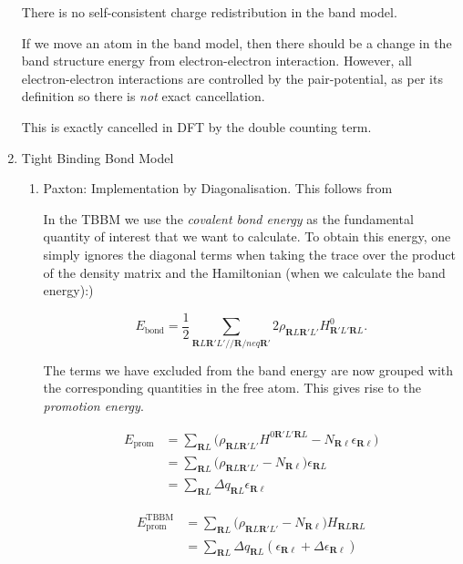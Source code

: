 \documentclass[11pt]{article}
\begin{document}
\begin{enumerate}
There is no self-consistent charge redistribution in the band model.

If we move an atom in the band model, then there should be a change in the band structure energy from electron-electron interaction. 
However, all electron-electron interactions are controlled by the pair-potential, as per its definition so there is \emph{not} exact 
cancellation. 

This is exactly cancelled in DFT by the double counting term. 


\item Tight Binding Bond Model
\label{sec:org6c91632}

\begin{enumerate}
\item Paxton: Implementation by Diagonalisation.
\label{sec:orga9fcfa0}
This follows from \cite{Paxton:153084}

In the TBBM we use the \emph{covalent bond energy} as the fundamental quantity of interest that we want to calculate.
To obtain this energy, one simply ignores the diagonal terms when taking the trace over the product of the density matrix and
the Hamiltonian (when we calculate the band energy):)

\[ 
E_{\text{bond}} = \frac{1}{2} \sum_{\mathbf{R}L\mathbf{R}'L'//\mathbf{R}/neq\mathbf{R}'}
                             2\rho_{\mathbf{R}L\mathbf{R}'L'} H^{0}_{\mathbf{R}'L'\mathbf{R}L}.
\]


The terms we have excluded from the band energy are now grouped with the corresponding quantities in the free atom. 
This gives rise to the \emph{promotion energy}.

\begin{align}
E_{\text{prom}} &= \sum_{\mathbf{R}L} \Big(\rho_{\mathbf{R}L\mathbf{R}'L'}H^{0\mathbf{R}'L'\mathbf{R}L} - N_{\mathbf{R}\ell}\epsilon_{\mathbf{R}\ell} \Big)\\
              &= \sum_{\mathbf{R}L} \Big(\rho_{\mathbf{R}L\mathbf{R}'L'} - N_{\mathbf{R}\ell} \Big) \epsilon_{\mathbf{R}L}\\
              &= \sum_{\mathbf{R}L} \Delta q_{\mathbf{R}L} \epsilon_{\mathbf{R}\ell}
\end{align}

\begin{align}
E_{\text{prom}}^{\text{TBBM}} &= \sum_{\mathbf{R}L} \Big(\rho_{\mathbf{R}L\mathbf{R}'L'} - N_{\mathbf{R}\ell} \Big) H_{\mathbf{R}L\mathbf{R}L}\\
              &= \sum_{\mathbf{R}L} \Delta q_{\mathbf{R}L}( \epsilon_{\mathbf{R}\ell} + \Delta \epsilon_{\mathbf{R}\ell} )
\end{align}


\end{enumerate}
\end{enumerate}
\end{document}

